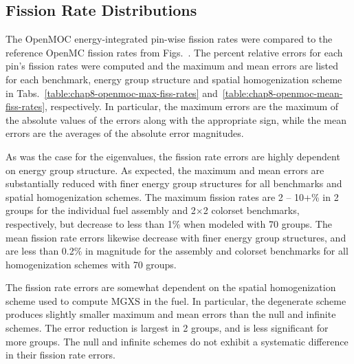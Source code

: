 \subsection{Fission Rate Distributions}
\label{subsec:chap8-fiss-rates}

The OpenMOC energy-integrated pin-wise fission rates were compared to the reference OpenMC fission rates from Figs.~. The percent relative errors for each pin's fission rates were computed and the maximum and mean errors are listed for each benchmark, energy group structure and spatial homogenization scheme in Tabs.~\ref{table:chap8-openmoc-max-fiss-rates} and~\ref{table:chap8-openmoc-mean-fiss-rates}, respectively. In particular, the maximum errors are the maximum of the absolute values of the errors along with the appropriate sign, while the mean errors are the averages of the absolute error magnitudes.

As was the case for the eigenvalues, the fission rate errors are highly dependent on energy group structure. As expected, the maximum and mean errors are substantially reduced with finer energy group structures for all benchmarks and spatial homogenization schemes. The maximum fission rates are 2 -- 10+\% in 2 groups for the individual fuel assembly and 2$\times$2 colorset benchmarks, respectively, but decrease to less than 1\% when modeled with 70 groups. The mean fission rate errors likewise decrease with finer energy group structures, and are less than 0.2\% in magnitude for the assembly and colorset benchmarks for all homogenization schemes with 70 groups.

The fission rate errors are somewhat dependent on the spatial homogenization scheme used to compute \ac{MGXS} in the fuel. In particular, the degenerate scheme produces slightly smaller maximum and mean errors than the null and infinite schemes. The error reduction is largest in 2 groups, and is less significant for more groups. The null and infinite schemes do not exhibit a systematic difference in their fission rate errors.


